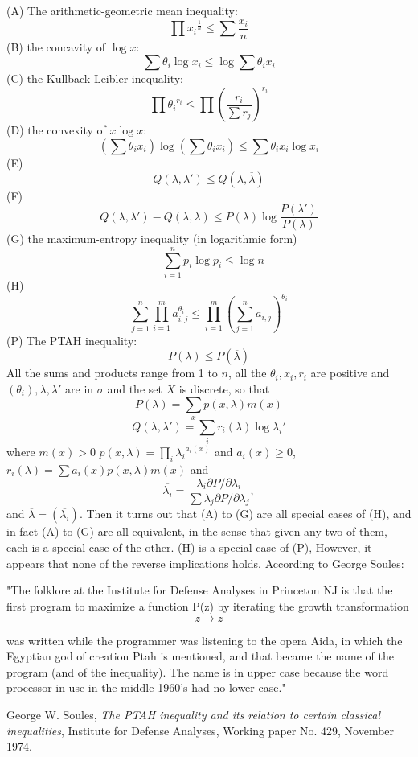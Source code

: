 \documentclass[12pt]{article}
\begin{document}
(A) The arithmetic-geometric mean inequality:
$$
\prod {x_i}^{\frac{1}{n}}\le \sum \frac{x_i}{n}
$$
(B) the concavity of $\log x$:
$$
\sum \theta_i \log x_i \le \log \sum \theta_i x_i
$$
(C) the Kullback-Leibler inequality:
$$
\prod {\theta_i}^{r_i} \le \prod (\frac{r_i}{\sum r_j})^{r_i}
$$
(D) the convexity of $x\log x$:
$$
(\sum \theta_i x_i )\log (\sum \theta_i x_i ) \le \sum \theta_i x_i \log x_i
$$
(E)
$$
Q(\lambda, \lambda') \le Q(\lambda , \overline{\lambda})
$$
(F) 
$$
Q(\lambda, \lambda') - Q(\lambda , \lambda) \le P(\lambda) \log \frac{P(\lambda')}{P(\lambda)}
$$
(G) the maximum-entropy inequality (in logarithmic form)
$$
 - \sum_{i=1}^n p_i \log p_i \le \log n  
$$
(H)  \\
$$
   \sum_{j=1}^n \prod_{i=1}^m a_{i,j}^{\theta_i} \le 
   \prod_{i=1}^m \left( \sum_{j=1}^n a_{i,j} \right)^{\theta_i}
$$
(P) The PTAH inequality:
$$
P(\lambda) \le P(\overline{\lambda})
$$
All the sums and products range from 1 to $n$, all the
$\theta_i, x_i, r_i$ are positive and 
$(\theta_i), \lambda, \lambda'$ are in $\sigma$ and the set $X$ is
discrete, so that
$$
P(\lambda) = \sum_x p(x,\lambda) m(x)
$$
$$
Q(\lambda, \lambda') = \sum_i r_i(\lambda) \log {\lambda_i}'
$$
where $m(x) > 0$ $p(x,\lambda) = \prod_i {\lambda_i}^{a_i(x)}$
and $a_i(x) \ge 0$,
 $r_i(\lambda) = \sum a_i(x)p(x,\lambda)m(x)$
and 
$$
\overline{\lambda_i} = \frac{\lambda_i \partial P/\partial \lambda_i}{\sum \lambda_j \partial P/\partial \lambda_j},
$$
and $\overline{\lambda} = (\overline{\lambda_i})$.
Then it turns out that (A) to (G) are all special cases of  (H), and
in fact (A) to (G) are all equivalent, in the sense that given any two of them,
each is a special case of the other.
(H) is a special case of (P), However, it appears that none of  the reverse 
implications holds.
According to George Soules:


"The folklore at the Institute for Defense Analyses in Princeton NJ
is that the first program to maximize a function P(z) by iterating the growth transformation
 $$
z \to \overline{z}
$$


was written while the programmer was listening to the opera Aida,
in which the Egyptian god of creation Ptah is mentioned, and that became the name of the program (and of the inequality). The name is in upper case because the word processor in use in the middle 1960's 
had no lower case."





\begin{thebibliography}{99}
George W. Soules, \emph{The PTAH inequality and its relation to certain classical inequalities}, Institute for Defense Analyses, Working paper No. 429, November 1974.
\end{thebibliography}
\end{document}
